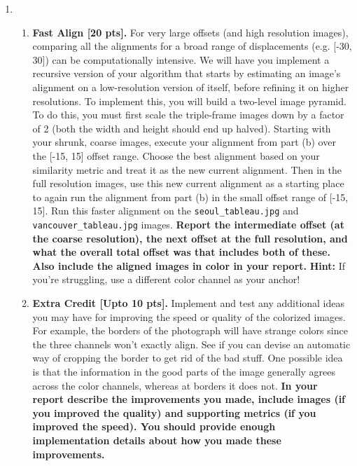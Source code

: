 \documentclass{article}
\def\pts#1{\textbf{[#1 pts]}}
\newenvironment{Q}{\clearpage \item}{\phantom{s} \bigskip}
\begin{document}
\begin{enumerate}
\begin{Q}
\begin{enumerate}
    \item \textbf{Fast Align \pts{20}.} For very large offsets (and high resolution images), comparing all the alignments for a broad range of displacements (e.g. [-30, 30]) can be computationally intensive. We will have you implement a recursive version of your algorithm that starts by estimating an image's alignment on a low-resolution version of itself, before refining it on higher resolutions. To implement this, you will build a two-level image pyramid. To do this, you must first scale the triple-frame images down by a factor of 2 (both the width and height should end up halved). Starting with your shrunk, coarse images, execute your alignment from part (b) over the [-15, 15] offset range. Choose the best alignment based on your similarity metric and treat it as the new current alignment. Then in the full resolution images, use this new current alignment as a starting place to again run the alignment from part (b) in the small offset range of [-15, 15]. Run this faster alignment on the \texttt{seoul\_tableau.jpg} and \texttt{vancouver\_tableau.jpg} images. 
    \textbf{Report the intermediate offset (at the coarse resolution), the next offset at the full resolution, and what the overall total offset was that includes both of these. Also include the aligned images in color in your report.} 
    \textbf{Hint:} If you’re struggling, use a different color channel as your anchor!
    
    \item \textbf{Extra Credit \pts{Upto 10}.} Implement and test any additional ideas you may have for improving the speed or quality of the colorized images. For example, the borders of the photograph will have strange colors since the three channels won't exactly align. See if you can devise an automatic way of cropping the border to get rid of the bad stuff. One possible idea is that the information in the good parts of the image generally agrees across the color channels, whereas at borders it does not. 
    \textbf{In your report describe the improvements you made, include images (if you improved the quality) and supporting metrics (if you improved the speed). You should provide enough implementation details about how you made these improvements.}
\end{enumerate}

\end{Q} %


\end{enumerate} %
\end{document}
